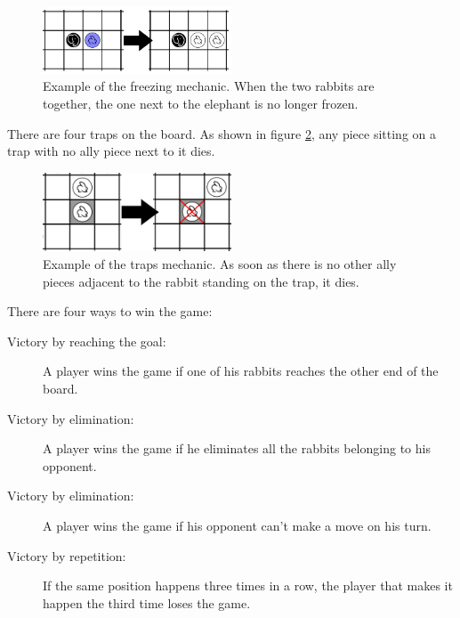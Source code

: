 \begin{figure}[!h]
\centering
\includegraphics[width=0.5\textwidth]{1_Presentation/1.1_Arimaa_rules_Gabriel/Pictures/Freeze.png}
\caption[Example of the freezing mechanic.]{Example of the freezing mechanic. When the two rabbits are together, the one next to the elephant is no longer frozen.}
\label{fig:freeze}
\end{figure}

There are four traps on the board. As shown in figure \ref{fig:trap}, any piece sitting on a trap with no ally piece next to it dies.

\begin{figure}[!h]
\centering
\includegraphics[width=0.5\textwidth]{1_Presentation/1.1_Arimaa_rules_Gabriel/Pictures/Trap.png}
\caption[Example of the traps mechanic.]{Example of the traps mechanic. As soon as there is no other ally pieces adjacent to the rabbit standing on the trap, it dies.}
\label{fig:trap}
\end{figure}

There are four ways to win the game:

\begin{description}
\item[Victory by reaching the goal:] A player wins the game if one of his rabbits reaches the other end of the board.
\item[Victory by elimination:] A player wins the game if he eliminates all the rabbits belonging to his opponent.
\item[Victory by elimination:] A player wins the game if his opponent can't make a move on his turn.
\item[Victory by repetition:] If the same position happens three times in a row, the player that makes it happen the third time loses the game.
\end{description}
